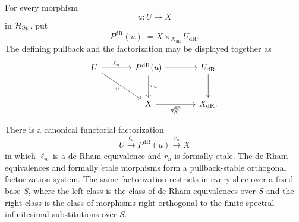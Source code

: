 \begin{theorem}
\label{thm:de-Rham-etale-factorization-system}
For every morphism
\[
  u:U\longrightarrow X
\]
in \(\mathcal H_{\operatorname{Sp}}\), put
\[
  P^{\mathrm{dR}}(u)
  :=
  X\times_{X_{\mathrm{dR}}}U_{\mathrm{dR}}.
\]
The defining pullback and the factorization may be displayed together as
\[
\begin{tikzcd}[column sep=large,row sep=large]
  U
    \arrow[r,"\ell_u"]
    \arrow[dr,"u"']
  &
  P^{\mathrm{dR}}(u)
    \arrow[r]
    \arrow[d,"r_u"]
  &
  U_{\mathrm{dR}}
    \arrow[d]
  \\
  & X \arrow[r,"\eta_X^{\mathrm{dR}}"'] & X_{\mathrm{dR}}.
\end{tikzcd}
\]

There is a canonical functorial factorization
\[
  U
  \xrightarrow{\ell_u}
  P^{\mathrm{dR}}(u)
  \xrightarrow{r_u}
  X
\]
in which \(\ell_u\) is a de Rham equivalence and \(r_u\) is formally
\(\acute{e}\)tale. The de Rham equivalences and formally
\(\acute{e}\)tale morphisms form a pullback-stable orthogonal factorization
system. The same factorization restricts in every slice over a fixed base \(S\),
where the left class is the class of de Rham equivalences over \(S\) and the right
class is the class of morphisms right orthogonal to the finite spectral infinitesimal
substitutions over \(S\).
\end{theorem}

